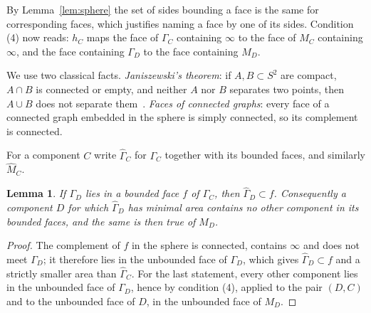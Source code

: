 \documentclass[11pt,a4paper]{article}
\newtheorem{lemma}[theorem]{Lemma}
\theoremstyle{definition}
\theoremstyle{remark}
\begin{document}
By Lemma~\ref{lem:sphere} the set of sides bounding a face is the same for
corresponding faces, which justifies naming a face by one of its sides.
Condition (4) now reads: $h_C$ maps the face of $\Gamma_C$ containing $\infty$
to the face of $M_C$ containing $\infty$, and the face containing $\Gamma_D$ to
the face containing $M_D$.

We use two classical facts. \emph{Janiszewski's theorem}: if $A,B\subset S^2$
are compact, $A\cap B$ is connected or empty, and neither $A$ nor $B$
separates two points, then $A\cup B$ does not separate
them~\cite{newman1951}. \emph{Faces of connected graphs}: every face of a
connected graph embedded in the sphere is simply connected, so its complement
is connected.

For a component $C$ write $\widehat{\Gamma}_C$ for $\Gamma_C$ together with
its bounded faces, and similarly $\widehat{M}_C$.

\begin{lemma}\label{lem:minimal}
If $\Gamma_D$ lies in a bounded face $f$ of $\Gamma_C$, then
$\widehat{\Gamma}_D\subset f$. Consequently a component $D$ for which
$\widehat{\Gamma}_D$ has minimal area contains no other component in its
bounded faces, and the same is then true of $M_D$.
\end{lemma}
\begin{proof}
The complement of $f$ in the sphere is connected, contains $\infty$ and does
not meet $\Gamma_D$; it therefore lies in the unbounded face of $\Gamma_D$,
which gives $\widehat{\Gamma}_D\subset f$ and a strictly smaller area than
$\widehat{\Gamma}_C$. For the last statement, every other component lies in
the unbounded face of $\Gamma_D$, hence by condition (4), applied to the pair
$(D,C)$ and to the unbounded face of $D$, in the unbounded face of $M_D$.
\end{proof}
\end{document}
